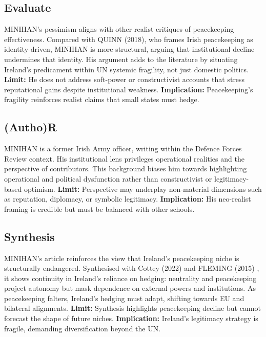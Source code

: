 \subsection*{Evaluate}
MINIHAN’s pessimism aligns with other realist critiques of peacekeeping effectiveness. Compared with QUINN (2018), who frames Irish peacekeeping as identity-driven, MINIHAN is more structural, arguing that institutional decline undermines that identity. His argument adds to the literature by situating Ireland’s predicament within UN systemic fragility, not just domestic politics.  
\textbf{Limit:} He does not address soft-power or constructivist accounts that stress reputational gains despite institutional weakness.  
\textbf{Implication:} Peacekeeping’s fragility reinforces realist claims that small states must hedge.

\subsection*{(Autho)R}
MINIHAN is a former Irish Army officer, writing within the Defence Forces Review context. His institutional lens privileges operational realities and the perspective of contributors. This background biases him towards highlighting operational and political dysfunction rather than constructivist or legitimacy-based optimism.  
\textbf{Limit:} Perspective may underplay non-material dimensions such as reputation, diplomacy, or symbolic legitimacy.  
\textbf{Implication:} His neo-realist framing is credible but must be balanced with other schools.

\subsection*{Synthesis}
MINIHAN’s article reinforces the view that Ireland’s peacekeeping niche is structurally endangered. Synthesised with Cottey (2022) \nocite{COTTEY_2022} and FLEMING (2015) \nocite{FLEMING_2015}, it shows continuity in Ireland’s reliance on hedging: neutrality and peacekeeping project autonomy but mask dependence on external powers and institutions. As peacekeeping falters, Ireland’s hedging must adapt, shifting towards EU and bilateral alignments.  
\textbf{Limit:} Synthesis highlights peacekeeping decline but cannot forecast the shape of future niches.  
\textbf{Implication:} Ireland’s legitimacy strategy is fragile, demanding diversification beyond the UN.

